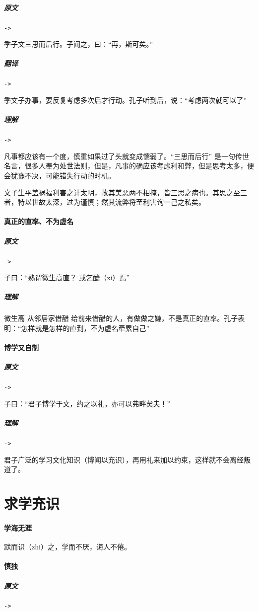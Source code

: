 \documentclass[UTF8,a4paper,8pt]{ctexbook}
\begin{document}
			\subparagraph{原文}\verb|->|
				
				季子文三思而后行。子闻之，曰：“再，斯可矣。”	
				
			\subparagraph{翻译}\verb|->|
				
				季文子办事，要反复考虑多次后才行动。孔子听到后，说：“考虑两次就可以了”	
			
			\subparagraph{理解}\verb|->|
				
				凡事都应该有一个度，慎重如果过了头就变成懦弱了。“三思而后行” 是一句传世名言，很多人奉为处世法则，但是，凡事的确应该考虑利和弊，但是思考太多，便会犹豫不决，可能错失行动的时机。
				
				
				文子生平盖祸福利害之计太明，故其美恶两不相掩，皆三思之病也。其思之至三者，特以世故太深，过为谨慎；然其流弊将至利害询一己之私矣。
				
		\paragraph{真正的直率、不为虚名}
			\subparagraph{原文}\verb|->|
			
				子曰：“熟谓微生高直？ 或乞醯（xi）焉”
				
			\subparagraph{理解}
				微生高 从邻居家借醋 给前来借醋的人，有做做之嫌，不是真正的直率。孔子表明：“怎样就是怎样的直到，不为虚名牵累自己”	
		
		\paragraph{博学又自制}
			\subparagraph{原文}\verb|->|
			
				子曰：“君子博学于文，约之以礼，亦可以弗畔矣夫！”	
			\subparagraph{理解}\verb|->|
			
				君子广泛的学习文化知识（博闻以充识），再用礼来加以约束，这样就不会离经叛道了。
		
	\section{求学充识}
		\paragraph{学海无涯}
			默而识（zhi）之，学而不厌，诲人不倦。
			
				
		\paragraph{慎独}
			\subparagraph{原文}\verb|->|
			
\end{document}
